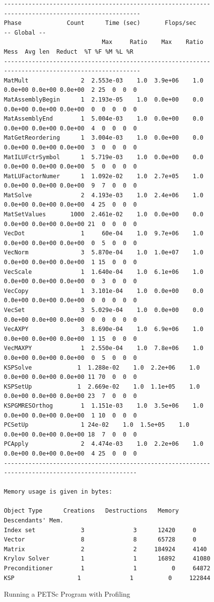 \begin{figure}[H]
{\begin{verbatim}
--------------------------------------------------------------------------------------------------
Phase             Count      Time (sec)       Flops/sec                             -- Global --    
                            Max     Ratio    Max    Ratio   Mess  Avg len  Reduct  %T %F %M %L %R   
--------------------------------------------------------------------------------------------------
MatMult               2  2.553e-03    1.0  3.9e+06    1.0  0.0e+00 0.0e+00 0.0e+00  2 25  0  0  0
MatAssemblyBegin      1  2.193e-05    1.0  0.0e+00    0.0  0.0e+00 0.0e+00 0.0e+00  0  0  0  0  0
MatAssemblyEnd        1  5.004e-03    1.0  0.0e+00    0.0  0.0e+00 0.0e+00 0.0e+00  4  0  0  0  0
MatGetReordering      1  3.004e-03    1.0  0.0e+00    0.0  0.0e+00 0.0e+00 0.0e+00  3  0  0  0  0
MatILUFctrSymbol      1  5.719e-03    1.0  0.0e+00    0.0  0.0e+00 0.0e+00 0.0e+00  5  0  0  0  0
MatLUFactorNumer      1  1.092e-02    1.0  2.7e+05    1.0  0.0e+00 0.0e+00 0.0e+00  9  7  0  0  0
MatSolve              2  4.193e-03    1.0  2.4e+06    1.0  0.0e+00 0.0e+00 0.0e+00  4 25  0  0  0
MatSetValues       1000  2.461e-02    1.0  0.0e+00    0.0  0.0e+00 0.0e+00 0.0e+00 21  0  0  0  0
VecDot                1     60e-04    1.0  9.7e+06    1.0  0.0e+00 0.0e+00 0.0e+00  0  5  0  0  0
VecNorm               3  5.870e-04    1.0  1.0e+07    1.0  0.0e+00 0.0e+00 0.0e+00  1 15  0  0  0
VecScale              1  1.640e-04    1.0  6.1e+06    1.0  0.0e+00 0.0e+00 0.0e+00  0  3  0  0  0
VecCopy               1  3.101e-04    1.0  0.0e+00    0.0  0.0e+00 0.0e+00 0.0e+00  0  0  0  0  0
VecSet                3  5.029e-04    1.0  0.0e+00    0.0  0.0e+00 0.0e+00 0.0e+00  0  0  0  0  0
VecAXPY               3  8.690e-04    1.0  6.9e+06    1.0  0.0e+00 0.0e+00 0.0e+00  1 15  0  0  0
VecMAXPY              1  2.550e-04    1.0  7.8e+06    1.0  0.0e+00 0.0e+00 0.0e+00  0  5  0  0  0
KSPSolve             1  1.288e-02    1.0  2.2e+06    1.0  0.0e+00 0.0e+00 0.0e+00 11 70  0  0  0
KSPSetUp             1  2.669e-02    1.0  1.1e+05    1.0  0.0e+00 0.0e+00 0.0e+00 23  7  0  0  0
KSPGMRESOrthog        1  1.151e-03    1.0  3.5e+06    1.0  0.0e+00 0.0e+00 0.0e+00  1 10  0  0  0
PCSetUp               1 24e-02    1.0  1.5e+05    1.0  0.0e+00 0.0e+00 0.0e+00 18  7  0  0  0
PCApply               2  4.474e-03    1.0  2.2e+06    1.0  0.0e+00 0.0e+00 0.0e+00  4 25  0  0  0
-------------------------------------------------------------------------------------------------

Memory usage is given in bytes:

Object Type      Creations   Destructions   Memory  Descendants' Mem.
Index set             3              3      12420     0
Vector                8              8      65728     0
Matrix                2              2     184924     4140
Krylov Solver         1              1      16892     41080
Preconditioner        1              1          0     64872
KSP                  1              1          0     122844

\end{verbatim}
}
\nobreak
\caption{Running a PETSc Program with Profiling}
\label{fig_exprof}
\end{figure}

